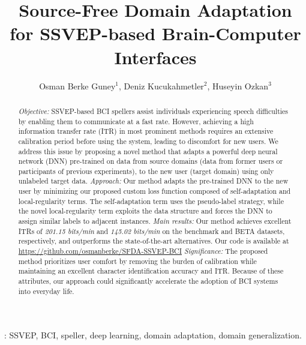 \documentclass[12pt]{iopart}
\begin{document}
\title[]{Source-Free Domain Adaptation for SSVEP-based Brain-Computer Interfaces}

\author{Osman Berke Guney$^1$, Deniz Kucukahmetler$^2$,
Huseyin Ozkan$^3$}

\address{$^1$ Department of Electrical and Computer Engineering, Boston University, Boston, MA, USA.}
\address{$^2$ Max Planck Institute for Human Cognitive and Brain Sciences, Leipzig, Germany.}
\address{$^3$ Faculty of Engineering and Natural Sciences, Sabanci University, Istanbul, Turkey.}
\vspace{10pt}

\begin{abstract}

\textit{Objective:} SSVEP-based BCI spellers assist individuals experiencing speech difficulties by enabling them to communicate at a fast rate. However, achieving a high information transfer rate (ITR) in most prominent methods requires an extensive calibration period before using the system, leading to discomfort for new users. We address this issue by proposing a novel method that adapts a powerful deep neural network (DNN) pre-trained on data from source domains (data from former users or participants of previous experiments), to the new user (target domain) using only unlabeled target data. \textit{Approach:} Our method adapts the pre-trained DNN to the new user by minimizing our proposed custom loss function composed of self-adaptation and local-regularity terms. The self-adaptation term uses the pseudo-label strategy, while the novel local-regularity term exploits the data structure and forces the DNN to assign similar labels to adjacent instances. \textit{ Main results:} Our method achieves excellent ITRs of \textit{201.15 bits/min} and \textit{145.02 bits/min} on the benchmark and BETA datasets, respectively, and outperforms the state-of-the-art alternatives. Our code is available at
\url{https://github.com/osmanberke/SFDA-SSVEP-BCI} \textit{Significance:} The proposed method prioritizes user comfort by removing the burden of calibration while maintaining an excellent character identification accuracy and ITR. Because of these attributes, our approach could significantly accelerate the adoption of BCI systems into everyday life.
\end{abstract}
: SSVEP, BCI, speller, deep learning, domain adaptation, domain generalization.
\end{document}
